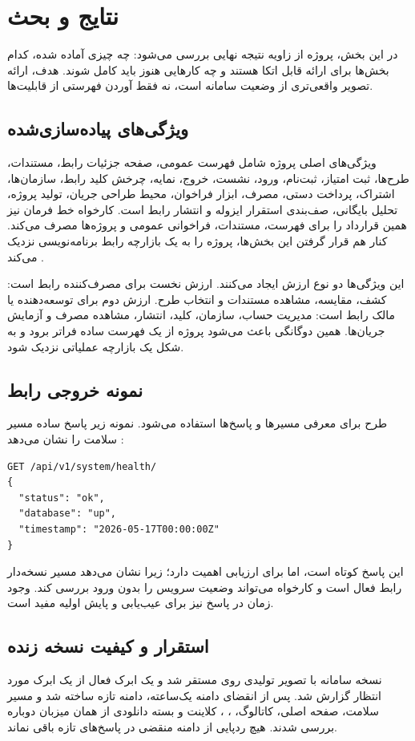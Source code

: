 \chapter{نتایج و بحث}

در این بخش، پروژه از زاویه نتیجه نهایی بررسی می‌شود: چه چیزی آماده شده، کدام بخش‌ها برای ارائه قابل اتکا هستند و چه کارهایی هنوز باید کامل شوند. هدف، ارائه تصویر واقعی‌تری از وضعیت سامانه است، نه فقط آوردن فهرستی از قابلیت‌ها.

\section{ویژگی‌های پیاده‌سازی‌شده}
ویژگی‌های اصلی پروژه شامل فهرست عمومی، صفحه جزئیات رابط، مستندات، طرح‌ها، ثبت امتیاز، ثبت‌نام، ورود، نشست، خروج، نمایه، چرخش کلید رابط، سازمان‌ها، اشتراک، پرداخت دستی، مصرف، ابزار فراخوان، محیط طراحی جریان، تولید پروژه، تحلیل بایگانی، صف‌بندی استقرار ایزوله و انتشار رابط است. کارخواه خط فرمان نیز همین قرارداد را برای فهرست، مستندات، فراخوانی عمومی و پروژه‌ها مصرف می‌کند. کنار هم قرار گرفتن این بخش‌ها، پروژه را به یک بازارچه رابط برنامه‌نویسی نزدیک می‌کند \cite{rapidapi}.

این ویژگی‌ها دو نوع ارزش ایجاد می‌کنند. ارزش نخست برای مصرف‌کننده رابط است: کشف، مقایسه، مشاهده مستندات و انتخاب طرح. ارزش دوم برای توسعه‌دهنده یا مالک رابط است: مدیریت حساب، سازمان، کلید، انتشار، مشاهده مصرف و آزمایش جریان‌ها. همین دوگانگی باعث می‌شود پروژه از یک فهرست ساده فراتر برود و به شکل یک بازارچه عملیاتی نزدیک شود.

\section{نمونه خروجی رابط}
طرح  برای معرفی مسیرها و پاسخ‌ها استفاده می‌شود. نمونه زیر پاسخ ساده مسیر سلامت را نشان می‌دهد \cite{openapi}:
\begin{latin}
\begin{lstlisting}
GET /api/v1/system/health/
{
  "status": "ok",
  "database": "up",
  "timestamp": "2026-05-17T00:00:00Z"
}
\end{lstlisting}
\end{latin}

این پاسخ کوتاه است، اما برای ارزیابی اهمیت دارد؛ زیرا نشان می‌دهد مسیر نسخه‌دار رابط فعال است و کارخواه می‌تواند وضعیت سرویس را بدون ورود بررسی کند. وجود زمان در پاسخ نیز برای عیب‌یابی و پایش اولیه مفید است.

\section{استقرار و کیفیت نسخه زنده}
نسخه  سامانه با تصویر تولیدی روی  مستقر شد و یک ابرک فعال از یک ابرک مورد انتظار گزارش شد. پس از انقضای دامنه یک‌ساعته، دامنه تازه ساخته شد و مسیر سلامت، صفحه اصلی، کاتالوگ، ، ،  کلاینت و بسته دانلودی از همان میزبان دوباره بررسی شدند. هیچ ردپایی از دامنه منقضی در پاسخ‌های تازه باقی نماند.

